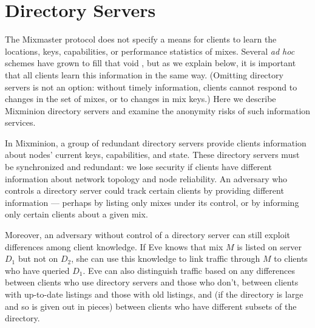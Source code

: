 \documentclass[final,inpress,inline]{ieee}
\begin{document}

\section{Directory Servers}
\label{sec:dir-servers}

The Mixmaster protocol does not specify a means for clients to learn the
locations, keys, capabilities, or performance statistics of mixes. Several
\emph{ad hoc} schemes have grown to fill that void \cite{levien}, but as we
explain below, it is important that all clients learn this information in
the same way.  (Omitting directory servers is not an option: without timely
information, clients cannot respond to changes in the set of mixes, or to
changes in mix keys.)
Here
we describe Mixminion directory servers and examine the anonymity risks
of such information services.

In Mixminion, a group of redundant directory servers provide clients
information about nodes' current keys, capabilities, and state.
These directory servers must be synchronized and redundant: we lose security if
clients have different information about network topology and node
reliability. An adversary who controls a directory server could track
certain clients by providing different information --- perhaps by listing
only mixes under its control, or by informing only certain clients about a
given mix.

Moreover, an adversary without control of a directory server can still exploit
differences among client knowledge. If Eve knows that mix $M$ is listed
on server $D_1$ but not on $D_2$, she can use this knowledge to link
traffic through $M$ to clients who have queried $D_1$.  Eve can also
distinguish traffic based on any differences between clients who use
directory servers and those who don't, between clients with up-to-date
listings and those with old listings, and (if the directory is large
and so is given out in pieces) between clients who have different subsets
of the directory.
\end{document}
